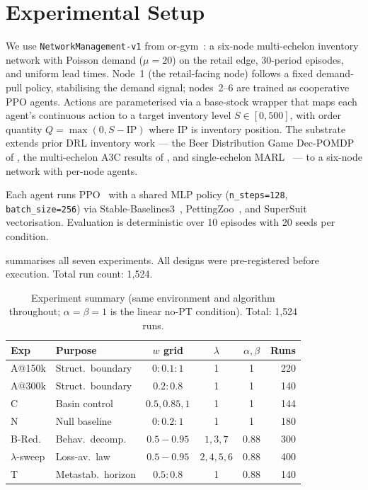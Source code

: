 \documentclass[letterpaper]{article}
\theoremstyle{plain}
\begin{document}
\section{Experimental Setup}
\label{sec:setup}

We use \texttt{NetworkManagement-v1} from or-gym~\citep{hubbs2020orgym}:
a six-node multi-echelon inventory network with Poisson demand
($\mu{=}20$) on the retail edge, 30-period episodes, and uniform lead
times.
Node~1 (the retail-facing node) follows a fixed demand-pull policy,
stabilising the demand signal; nodes~2--6 are trained as cooperative PPO
agents.
Actions are parameterised via a base-stock wrapper that maps each
agent's continuous action to a target inventory level $S \in [0, 500]$,
with order quantity $Q = \max(0, S - \mathrm{IP})$ where $\mathrm{IP}$
is inventory position.
The substrate extends prior DRL inventory work --- the Beer Distribution
Game Dec-POMDP of \citet{oroojlooyjadid2022}, the multi-echelon A3C
results of \citet{gijsbrechts2022}, and single-echelon
MARL~\citep{marlim2023} --- to a six-node network with per-node agents.

Each agent runs PPO~\citep{schulman2017ppo} with a shared MLP policy
(\texttt{n\_steps=128}, \texttt{batch\_size=256}) via
Stable-Baselines3~\citep{raffin2021sb3}, PettingZoo~\citep{terry2021pettingzoo},
and SuperSuit~\citep{terry2020supersuit} vectorisation.
Evaluation is deterministic over 10 episodes with 20 seeds per condition.

 summarises all seven experiments.
All designs were pre-registered before execution.
Total run count: 1,524.

\begin{table}[t]
\centering
\caption{Experiment summary (same environment and algorithm throughout;
$\alpha{=}\beta{=}1$ is the linear no-PT condition). Total: 1{,}524 runs.}
\label{tab:experiments}
\footnotesize
\setlength{\tabcolsep}{3.5pt}
\begin{tabular}{llcccr}
\toprule
Exp & Purpose & $w$ grid & $\lambda$ & $\alpha,\beta$ & Runs \\
\midrule
A@150k  & Struct.\ boundary  & $0{:}0.1{:}1$ & 1 & 1 & 220 \\
A@300k  & Struct.\ boundary  & $0.2{:}0.8$   & 1 & 1 & 140 \\
C       & Basin control      & $0.5,0.85,1$  & 1 & 1 & 144 \\
N       & Null baseline      & $0{:}0.2{:}1$ & 1 & 1 & 180 \\
B-Red.  & Behav.\ decomp.    & $0.5{-}0.95$  & $1,3,7$ & 0.88 & 300 \\
$\lambda$-sweep & Loss-av.\ law & $0.5{-}0.95$ & $2,4,5,6$ & 0.88 & 400 \\
T       & Metastab.\ horizon & $0.5{:}0.8$   & 1 & 0.88 & 140 \\
\bottomrule
\end{tabular}
\end{table}
\end{document}
